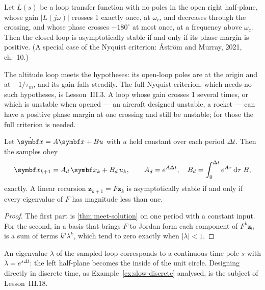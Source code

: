 \begin{theorem}
\label{thm:slow-bode}
Let $L(s)$ be a loop transfer function with no poles in the open right half-plane, whose gain $|L(j\omega)|$ crosses 1 exactly once, at $\omega_c$, and decreases through the crossing, and whose phase crosses $-180^\circ$ at most once, at a frequency above $\omega_c$. Then the closed loop is asymptotically stable if and only if its phase margin is positive. (A special case of the Nyquist criterion: Åström and Murray, 2021, ch.~10.)
\end{theorem}

The altitude loop meets the hypotheses: its open-loop poles are at the origin and at $-1/\tau_m$, and its gain falls steadily. The full Nyquist criterion, which needs no such hypotheses, is Lesson~III.3. A loop whose gain crosses 1 several times, or which is unstable when opened — an aircraft designed unstable, a rocket — can have a positive phase margin at one crossing and still be unstable; for those the full criterion is needed.

\begin{theorem}
\label{thm:slow-sampled}
Let $\dot{\vx} = A\vx + Bu$ with $u$ held constant over each period $\Delta t$. Then the samples obey
\begin{equation*}
  \vx_{k+1} = A_d\,\vx_k + B_d\,u_k, \qquad A_d = e^{A\Delta t}, \quad B_d = \int_0^{\Delta t} e^{A\tau}\,\dd\tau\;B ,
\end{equation*}
exactly. A linear recursion $\symbf z_{k+1} = F\symbf z_k$ is asymptotically stable if and only if every eigenvalue of $F$ has magnitude less than one.
\end{theorem}
\begin{proof}
The first part is \cref{thm:meet-solution} on one period with a constant input. For the second, in a basis that brings $F$ to Jordan form each component of $F^k\symbf z_0$ is a sum of terms $k^j\lambda^k$, which tend to zero exactly when $|\lambda| < 1$.
\end{proof}

An eigenvalue $\lambda$ of the sampled loop corresponds to a continuous-time pole $s$ with $\lambda = e^{s\Delta t}$: the left half-plane becomes the inside of the unit circle. Designing directly in discrete time, as Example~\ref{ex:slow-discrete} analysed, is the subject of Lesson~III.18.

